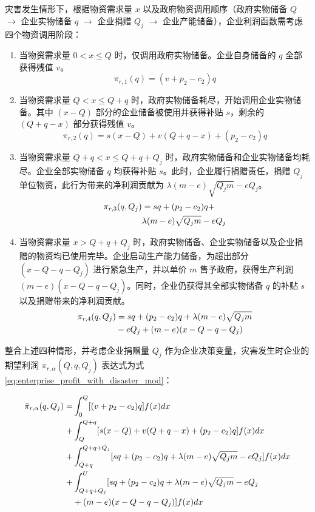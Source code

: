\documentclass[a4paper,8pt,twocolumn]{article} %
\begin{document}
灾害发生情形下，根据物资需求量 $x$ 以及政府物资调用顺序（政府实物储备 $Q$ $\rightarrow$ 企业实物储备 $q$ $\rightarrow$ 企业捐赠 $Q_j$ $\rightarrow$ 企业产能储备），企业利润函数需考虑四个物资调用阶段：
\begin{enumerate}
\item 当物资需求量 $0 < x \leq Q$ 时，仅调用政府实物储备。企业自身储备的 $q$ 全部获得残值 $v$。
\begin{equation} \label{eq:enterprise_profit_r1_mod}
\pi_{r,1}(q) = (v + p_2 - c_2)q
\end{equation}
\item 当物资需求量 $Q < x \leq Q+q$ 时，政府实物储备耗尽，开始调用企业实物储备。其中 $(x-Q)$ 部分的企业储备被使用并获得补贴 $s$，剩余的 $(Q+q-x)$ 部分获得残值 $v$。
\begin{equation} \label{eq:enterprise_profit_r2_mod}
\pi_{r,2}(q) = s(x-Q) + v(Q + q - x) + (p_2 - c_2)q
\end{equation}
\item 当物资需求量 $Q+q < x \leq Q+q+Q_j$ 时，政府实物储备和企业实物储备均耗尽。企业全部实物储备 $q$ 均获得补贴 $s$。此时，企业履行捐赠责任，捐赠 $Q_j$ 单位物资，此行为带来的净利润贡献为 $\lambda(m-e)\sqrt{Q_jm} - eQ_j$。
\begin{align} \label{eq:enterprise_profit_r3_mod}
\pi_{r,3}(q, Q_j)& = sq + (p_2 - c_2)q +\\ 
& \lambda(m-e)\sqrt{Q_jm}  \notag  - eQ_j
\end{align}
\item 当物资需求量 $x > Q+q+Q_j$ 时，政府实物储备、企业实物储备以及企业捐赠的物资均已使用完毕。企业启动生产能力储备，为超出部分 $(x-Q-q-Q_j)$ 进行紧急生产，并以单价 $m$ 售予政府，获得生产利润 $(m-e)(x-Q-q-Q_j)$。同时，企业仍获得其全部实物储备 $q$ 的补贴 $s$ 以及捐赠带来的净利润贡献。
\begin{align}
     \label{eq:enterprise_profit_r4_mod}
\pi_{r,4}(q, Q_j)& = sq + (p_2 - c_2)q +  \lambda(m-e)\sqrt{Q_jm}\notag \\ 
&- eQ_j + (m-e)(x-Q-q-Q_j)
\end{align}
\end{enumerate}

整合上述四种情形，并考虑企业捐赠量 $Q_j$ 作为企业决策变量，灾害发生时企业的期望利润 ${\pi}_{r,\alpha}(Q,q,Q_j)$ 表达式为式\eqref{eq:enterprise_profit_with_disaster_mod}：
\begin{tiny}
\begin{align} \label{eq:enterprise_profit_with_disaster_mod}
\bar{\pi}_{r,\alpha}(q,Q_j) = & \int_0^Q [(v + p_2 - c_2)q] f(x)dx \notag \\
+ & \int_Q^{Q+q} [s(x-Q) + v(Q + q - x) + (p_2 - c_2)q] f(x)dx \notag \\
+ & \int_{Q+q}^{Q+q+Q_j} [sq + (p_2 - c_2)q + \lambda(m-e)\sqrt{Q_jm} - eQ_j] f(x)dx \notag \\
+ & \int_{Q+q+Q_j}^U [sq + (p_2 - c_2)q + \lambda(m-e)\sqrt{Q_jm} - eQ_j \notag \\
& + (m-e)(x-Q-q-Q_j)] f(x)dx
\end{align}
\end{tiny}
\end{document}
